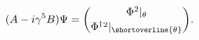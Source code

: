 \begin{equation}
(A-i\gamma^5B)\Psi=\binom{\Phi^2|_{\theta\vphantom{\shortoverline{\theta}}}}{\smash{\Phi^\dagger}^2|_{\shortoverline{\theta}}}.
\end{equation}

